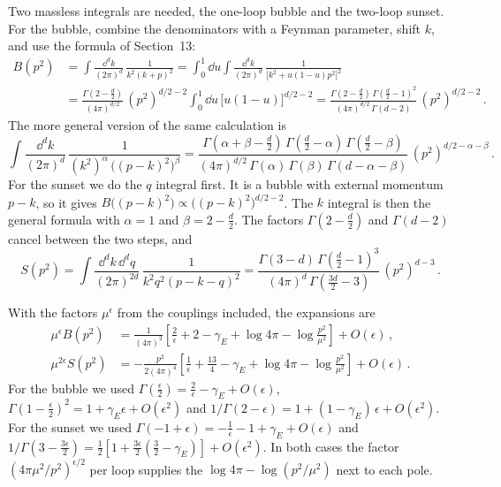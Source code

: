  Two massless integrals are needed, the one-loop bubble
and the two-loop sunset. For the bubble, combine the denominators with a
Feynman parameter, shift $k$, and use the formula of Section~13:
\begin{align*}
B(p^2)&=\int\frac{\dd^dk}{(2\pi)^d}\,\frac1{k^2(k+p)^2}
=\int_0^1\dd u\int\frac{\dd^dk}{(2\pi)^d}\,\frac1{\bigl[k^2+u(1-u)p^2\bigr]^2}\\
&=\frac{\Gamma\left(2-\frac d2\right)}{(4\pi)^{d/2}}\,(p^2)^{d/2-2}\int_0^1\dd u\,\bigl[u(1-u)\bigr]^{d/2-2}
=\frac{\Gamma\left(2-\frac d2\right)\,\Gamma\left(\frac d2-1\right)^2}{(4\pi)^{d/2}\,\Gamma(d-2)}\,(p^2)^{d/2-2}\,.
\end{align*}
The more general version of the same calculation is
\[
\int\frac{\dd^dk}{(2\pi)^d}\,\frac1{(k^2)^\alpha\,\bigl((p-k)^2\bigr)^\beta}
=\frac{\Gamma\left(\alpha+\beta-\frac d2\right)\,\Gamma\left(\frac d2-\alpha\right)\,\Gamma\left(\frac d2-\beta\right)}{(4\pi)^{d/2}\,\Gamma(\alpha)\,\Gamma(\beta)\,\Gamma(d-\alpha-\beta)}\,(p^2)^{d/2-\alpha-\beta}\,.
\]
For the sunset we do the $q$ integral first. It is a bubble with external
momentum $p-k$, so it gives $B\bigl((p-k)^2\bigr)\propto\bigl((p-k)^2\bigr)^{d/2-2}$.
The $k$ integral is then the general formula with $\alpha=1$ and
$\beta=2-\frac d2$. The factors $\Gamma\left(2-\frac d2\right)$ and $\Gamma(d-2)$
cancel between the two steps, and
\[
S(p^2)=\int\frac{\dd^dk\,\dd^dq}{(2\pi)^{2d}}\,\frac1{k^2q^2(p-k-q)^2}
=\frac{\Gamma(3-d)\,\Gamma\left(\frac d2-1\right)^3}{(4\pi)^d\,\Gamma\left(\frac{3d}2-3\right)}\,(p^2)^{d-3}\,.
\]

 With the factors $\mu^\epsilon$ from the
couplings included, the expansions are
\begin{align*}
\mu^\epsilon B(p^2)&=\frac1{(4\pi)^2}\left[\frac2\epsilon+2-\gamma_E+\log4\pi-\log\frac{p^2}{\mu^2}\right]+O(\epsilon)\,,\\
\mu^{2\epsilon}S(p^2)&=-\frac{p^2}{2(4\pi)^4}\left[\frac1\epsilon+\frac{13}4-\gamma_E+\log4\pi-\log\frac{p^2}{\mu^2}\right]+O(\epsilon)\,.
\end{align*}
For the bubble we used $\Gamma\left(\frac\epsilon2\right)=\frac2\epsilon-\gamma_E+O(\epsilon)$,
$\Gamma\left(1-\frac\epsilon2\right)^2=1+\gamma_E\epsilon+O(\epsilon^2)$ and
$1/\Gamma(2-\epsilon)=1+(1-\gamma_E)\,\epsilon+O(\epsilon^2)$. For the sunset we
used $\Gamma(-1+\epsilon)=-\frac1\epsilon-1+\gamma_E+O(\epsilon)$ and
$1/\Gamma\left(3-\frac{3\epsilon}2\right)=\frac12\left[1+\frac{3\epsilon}2\left(\frac32-\gamma_E\right)\right]+O(\epsilon^2)$.
In both cases the factor $(4\pi\mu^2/p^2)^{\epsilon/2}$ per loop supplies the
$\log4\pi-\log(p^2/\mu^2)$ next to each pole.

